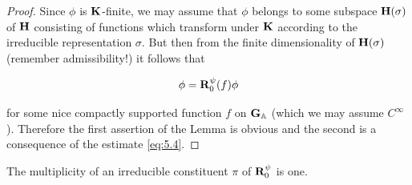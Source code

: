 \begin{proof}

Since $\phi$ is $\mathbf{K}$-finite, we may assume that $\phi$ belongs to some subspace $\mathbf{H}(\sigma)$ of $\mathbf{H}$ consisting of functions which transform under $\mathbf{K}$ according to the irreducible representation $\sigma$. But then from the finite dimensionality of $\mathbf{H}(\sigma)$ (remember admissibility!) it follows that

\[
\phi = \mathbf{R}_0^{\psi}(f)\phi
\]

for some nice compactly supported function $f$ on $\mathbf{G}_{\mathbb{A}}$ (which we may assume $C^{\infty}$). Therefore the first assertion of the Lemma is obvious and the second is a consequence of the estimate \eqref{eq:5.4}.

\end{proof}

\begin{theorem}\label{thm:5.7}

The multiplicity of an irreducible constituent $\pi$ of $\mathbf{R}_0^{\psi}$ is one.

\end{theorem}

